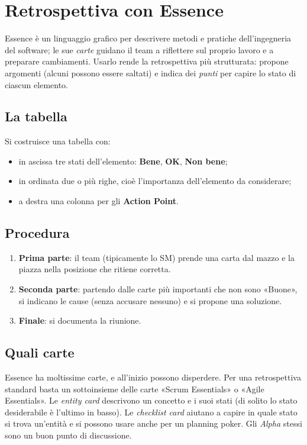 \documentclass[a4paper,11pt]{article}
\begin{document}
\section{Retrospettiva con Essence}
Essence è un linguaggio grafico per descrivere metodi e pratiche dell'ingegneria del
software; le sue \emph{carte} guidano il team a riflettere sul proprio lavoro e a
preparare cambiamenti. Usarlo rende la retrospettiva più strutturata: propone argomenti
(alcuni possono essere saltati) e indica dei \emph{punti} per capire lo stato di ciascun
elemento.

\subsection*{La tabella}
Si costruisce una tabella con:
\begin{itemize}[nosep]
  \item in ascissa tre stati dell'elemento: \textbf{Bene}, \textbf{OK}, \textbf{Non bene};
  \item in ordinata due o più righe, cioè l'importanza dell'elemento da considerare;
  \item a destra una colonna per gli \textbf{Action Point}.
\end{itemize}

\subsection*{Procedura}
\begin{enumerate}[nosep]
  \item \textbf{Prima parte}: il team (tipicamente lo SM) prende una carta dal mazzo e la
        piazza nella posizione che ritiene corretta.
  \item \textbf{Seconda parte}: partendo dalle carte più importanti che non sono «Buone»,
        si indicano le cause (senza accusare nessuno) e si propone una soluzione.
  \item \textbf{Finale}: si documenta la riunione.
\end{enumerate}

\subsection*{Quali carte}
Essence ha moltissime carte, e all'inizio possono disperdere. Per una retrospettiva
standard basta un sottoinsieme delle carte «Scrum Essentials» o «Agile Essentials».
Le \emph{entity card} descrivono un concetto e i suoi stati (di solito lo stato
desiderabile è l'ultimo in basso). Le \emph{checklist card} aiutano a capire in quale stato
si trova un'entità e si possono usare anche per un planning poker. Gli \emph{Alpha} stessi
sono un buon punto di discussione.
\end{document}

